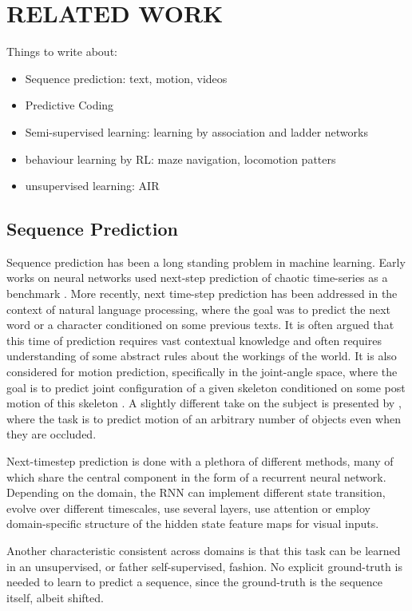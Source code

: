 \section{RELATED WORK}

Things to write about:
\begin{itemize}
	\item Sequence prediction: text, motion, videos
	\item Predictive Coding
	\item Semi-supervised learning: learning by association and ladder networks
	\item behaviour learning by RL: maze navigation, locomotion patters
	\item unsupervised learning: AIR
\end{itemize}

\subsection{Sequence Prediction}

	Sequence prediction has been a long standing problem in machine learning. Early works on neural networks used next-step prediction of chaotic time-series as a benchmark \addref. More recently, next time-step prediction has been addressed in the context of natural language processing, where the goal was to predict the next word \addref or a character \addref conditioned on some previous texts. It is often argued that this time of prediction requires vast contextual knowledge and often requires understanding of some abstract rules about the workings of the world. It is also considered for motion prediction, specifically in the joint-angle space, where the goal is to predict joint configuration of a given skeleton conditioned on some post motion of this skeleton \addref. A slightly different take on the subject is presented by , where the task is to predict motion of an arbitrary number of objects even when they are occluded.
	
	Next-timestep prediction is done with a plethora of different methods, many of which share the central component in the form of a recurrent neural network. Depending on the domain, the RNN can implement different state transition, evolve over different timescales, use several layers, use attention or employ domain-specific structure of the hidden state \eg feature maps for visual inputs. 
	
	Another characteristic consistent across domains is that this task can be learned in an unsupervised, or father self-supervised, fashion. No explicit ground-truth is needed to learn to predict a sequence, since the ground-truth is the sequence itself, albeit shifted. 
	
